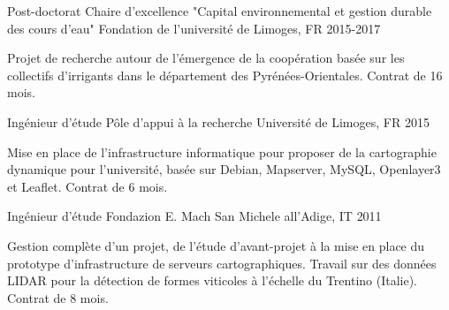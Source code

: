 \begin{cventries}
\cventry
  {Post-doctorat} %
  {Chaire d'excellence "Capital environnemental et gestion durable des cours d'eau"} %
  {Fondation de l'université de Limoges, FR} %
  {2015-2017} %
  {
    \begin{cvitems} %
      Projet de recherche autour de l'émergence de la coopération basée sur les collectifs d'irrigants dans le département des Pyrénées-Orientales. Contrat de 16 mois.
    \end{cvitems}
  }

\cventry
  {Ingénieur d'étude} %
  {Pôle d'appui à la recherche} %
  {Université de Limoges, FR} %
  {2015} %
  {
    \begin{cvitems} %
    Mise en place de l'infrastructure informatique pour proposer de la cartographie dynamique pour l'université, basée sur Debian, Mapserver, MySQL, Openlayer3 et Leaflet. Contrat de 6 mois.
    \end{cvitems}
  }

\cventry
  {Ingénieur d'étude} %
  {Fondazion E. Mach} %
  {San Michele all'Adige, IT} %
  {2011} %
  {
    \begin{cvitems} %
    Gestion complète d'un projet, de l'étude d'avant-projet à la mise en place du prototype d'infrastructure de serveurs cartographiques. Travail sur des données LIDAR pour la détection de formes viticoles à l'échelle du Trentino (Italie). Contrat de 8 mois.
    \end{cvitems}
  }


\end{cventries}
